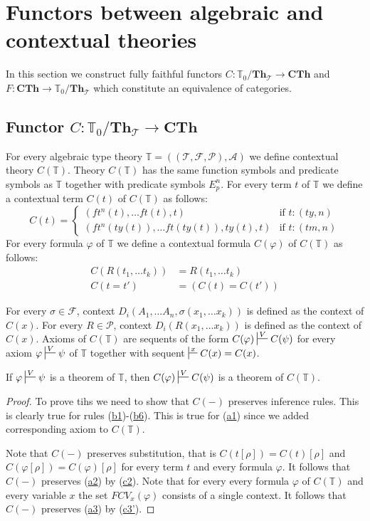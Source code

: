 \documentclass[reqno]{amsart}
\newcommand{\axref}[1]{(\hyperref[ax:#1]{#1})}
\theoremstyle{definition}
\theoremstyle{remark}
\newcommand{\cat}[1]{\mathbf{#1}}
\newcommand{\Th}{\cat{Th}}
\newcommand{\CTh}{\cat{CTh}}
\newcommand{\ThT}{\Th_{\mathcal{T}}}
\numberwithin{figure}{section}
\begin{document}
\section{Functors between algebraic and contextual theories}

In this section we construct fully faithful functors $C : \mathbb{T}_0/\ThT \to \CTh$ and $F : \CTh \to \mathbb{T}_0/\ThT$ which constitute an equivalence of categories.

\subsection{Functor $C : \mathbb{T}_0/\ThT \to \CTh$}

For every algebraic type theory $\mathbb{T} = ((\mathcal{T},\mathcal{F},\mathcal{P}),\mathcal{A})$ we define contextual theory $C(\mathbb{T})$.
Theory $C(\mathbb{T})$ has the same function symbols and predicate symbols as $\mathbb{T}$ together with predicate symbols $E^n_p$.
For every term $t$ of $\mathbb{T}$ we define a contextual term $C(t)$ of $C(\mathbb{T})$ as follows:
\[ C(t) = 
  \begin{cases}
      (ft^n(t), \ldots ft(t), t) & \text{if } t : (ty,n) \\
      (ft^n(ty(t)), \ldots ft(ty(t)), ty(t), t) & \text{if } t : (tm,n)
  \end{cases}
\]
For every formula $\varphi$ of $\mathbb{T}$ we define a contextual formula $C(\varphi)$ of $C(\mathbb{T})$ as follows:
\begin{align*}
C(R(t_1, \ldots t_k)) & = R(t_1, \ldots t_k) \\
C(t = t') & = (C(t) = C(t'))
\end{align*}

For every $\sigma \in \mathcal{F}$, context $D_i(A_1, \ldots A_n, \sigma(x_1, \ldots x_k))$ is defined as the context of $C(x)$.
For every $R \in \mathcal{P}$, context $D_i(R(x_1, \ldots x_k))$ is defined as the context of $C(x)$.
Axioms of $C(\mathbb{T})$ are sequents of the form $C(\varphi) \sststile{}{V} C(\psi)$ for every axiom $\varphi \sststile{}{V} \psi$ of $\mathbb{T}$
    together with sequent $\sststile{}{x} C(x) = C(x)$.

\begin{lem}
If $\varphi \sststile{}{V} \psi$ is a theorem of $\mathbb{T}$, then $C(\varphi) \sststile{}{V} C(\psi)$ is a theorem of $C(\mathbb{T})$.
\end{lem}
\begin{proof}
To prove tihs we need to show that $C(-)$ preserves inference rules.
This is clearly true for rules \axref{b1}-\axref{b6}.
This is true for \axref{a1} since we added corresponding axiom to $C(\mathbb{T})$.

Note that $C(-)$ preserves substitution, that is $C(t[\rho]) = C(t)[\rho]$ and $C(\varphi[\rho]) = C(\varphi)[\rho]$ for every term $t$ and every formula $\varphi$.
It follows that $C(-)$ preserves \axref{a2} by \axref{c2}.
Note that for every every formula $\varphi$ of $C(\mathbb{T})$ and every variable $x$ the set $FCV_x(\varphi)$ consists of a single context.
It follows that $C(-)$ preserves \axref{a3} by \axref{c3'}.
\end{proof}
\end{document}
